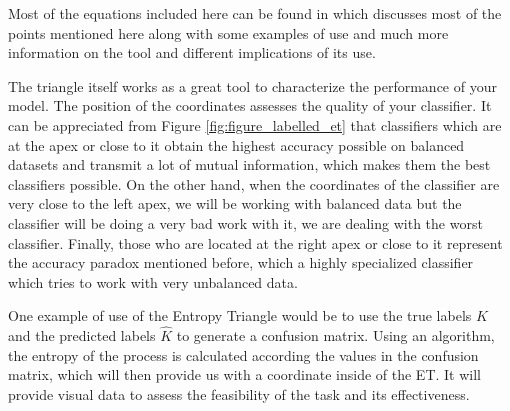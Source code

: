 Most of the equations included here can be found in \cite{val:pel:18c} which discusses most of the points mentioned here along with some examples of use and much more information on the tool and different implications of its use. \par

The triangle itself works as a great tool to characterize the performance of your model. The position of the coordinates assesses the quality of your classifier. It can be appreciated from Figure \ref{fig:figure_labelled_et} that classifiers which are at the apex or close to it obtain the highest accuracy possible on balanced datasets and transmit a lot of mutual information, which makes them the best classifiers possible. On the other hand, when the coordinates of the classifier are very close to the left apex, we will be working with balanced data but the classifier will be doing a very bad work with it, we are dealing with the worst classifier. Finally, those who are located at the right apex or close to it represent the accuracy paradox mentioned before, which a highly specialized classifier which tries to work with very unbalanced data.\par

One example of use of the Entropy Triangle would be to use the true labels $K$ and the predicted labels $\hat{K}$ to generate a confusion matrix. Using an algorithm, the entropy of the process is calculated according the values in the confusion matrix, which will then provide us with a coordinate inside of the ET. It will provide visual data to assess the feasibility of the task and its effectiveness.\par




